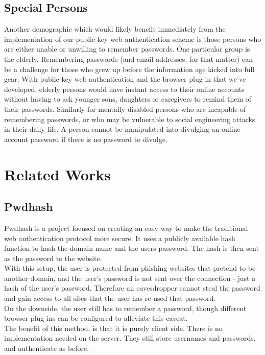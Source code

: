 \documentclass[11pt]{article}
\begin{document}
\subsection{Special Persons} \label{subsec:specialpersons}
Another demographic which would likely benefit immediately from the implementation of our public-key web authentication scheme is those persons who are either unable or unwilling to remember passwords.  One particular group is the elderly.  Remembering passwords (and email addresses, for that matter) can be a challenge for those who grew up before the information age kicked into full gear.  With public-key web authentication and the browser plug-in that we've developed, elderly persons would have instant access to their online accounts without having to ask younger sons, daughters or caregivers to remind them of their passwords.  Similarly for mentally disabled persons who are incapable of remembering passwords, or who may be vulnerable to social engineering attacks in their daily life.  A person cannot be manipulated into divulging an online account password if there is no password to divulge.

\section{Related Works} \label{sec:relatedWorks}
\subsection{Pwdhash}  \label{subsec:pwdhash}
Pwdhash\cite{pwdhash} is a project focused on creating an easy way to make the traditional web authentication protocol more secure. It uses a publicly available hash function to hash the domain name and the users password. The hash is then sent as the password to the website.\\
	With this setup, the user is protected from phishing websites that pretend to be another domain, and the user’s password is not sent over the connection - just a hash of the user's password. Therefore an eavesdropper cannot steal the password and gain access to all sites that the user has re-used that password.\\
	On the downside, the user still has to remember a password, though different browser plug-ins can be configured to alleviate this caveat.\\
The benefit of this method, is that it is purely client side. There is no implementation needed on the server. They still store usernames and passwords, and authenticate as before.
\end{document}
